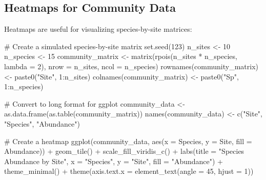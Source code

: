 \documentclass[
  letterpaper,
]{book}
\newenvironment{Shaded}{\begin{snugshade}}{\end{snugshade}}
\newcommand{\AttributeTok}[1]{\textcolor[rgb]{0.40,0.45,0.13}{#1}}
\newcommand{\CommentTok}[1]{\textcolor[rgb]{0.37,0.37,0.37}{#1}}
\newcommand{\DecValTok}[1]{\textcolor[rgb]{0.68,0.00,0.00}{#1}}
\newcommand{\FunctionTok}[1]{\textcolor[rgb]{0.28,0.35,0.67}{#1}}
\newcommand{\NormalTok}[1]{\textcolor[rgb]{0.00,0.23,0.31}{#1}}
\newcommand{\OtherTok}[1]{\textcolor[rgb]{0.00,0.23,0.31}{#1}}
\newcommand{\SpecialCharTok}[1]{\textcolor[rgb]{0.37,0.37,0.37}{#1}}
\newcommand{\StringTok}[1]{\textcolor[rgb]{0.13,0.47,0.30}{#1}}
\begin{document}
\subsection{Heatmaps for Community
Data}\label{heatmaps-for-community-data}

Heatmaps are useful for visualizing species-by-site matrices:

\begin{Shaded}
\begin{Highlighting}[]
\CommentTok{\# Create a simulated species{-}by{-}site matrix}
\FunctionTok{set.seed}\NormalTok{(}\DecValTok{123}\NormalTok{)}
\NormalTok{n\_sites }\OtherTok{\textless{}{-}} \DecValTok{10}
\NormalTok{n\_species }\OtherTok{\textless{}{-}} \DecValTok{15}
\NormalTok{community\_matrix }\OtherTok{\textless{}{-}} \FunctionTok{matrix}\NormalTok{(}\FunctionTok{rpois}\NormalTok{(n\_sites }\SpecialCharTok{*}\NormalTok{ n\_species, }\AttributeTok{lambda =} \DecValTok{2}\NormalTok{), }
                          \AttributeTok{nrow =}\NormalTok{ n\_sites, }\AttributeTok{ncol =}\NormalTok{ n\_species)}
\FunctionTok{rownames}\NormalTok{(community\_matrix) }\OtherTok{\textless{}{-}} \FunctionTok{paste0}\NormalTok{(}\StringTok{"Site"}\NormalTok{, }\DecValTok{1}\SpecialCharTok{:}\NormalTok{n\_sites)}
\FunctionTok{colnames}\NormalTok{(community\_matrix) }\OtherTok{\textless{}{-}} \FunctionTok{paste0}\NormalTok{(}\StringTok{"Sp"}\NormalTok{, }\DecValTok{1}\SpecialCharTok{:}\NormalTok{n\_species)}

\CommentTok{\# Convert to long format for ggplot}
\NormalTok{community\_data }\OtherTok{\textless{}{-}} \FunctionTok{as.data.frame}\NormalTok{(}\FunctionTok{as.table}\NormalTok{(community\_matrix))}
\FunctionTok{names}\NormalTok{(community\_data) }\OtherTok{\textless{}{-}} \FunctionTok{c}\NormalTok{(}\StringTok{"Site"}\NormalTok{, }\StringTok{"Species"}\NormalTok{, }\StringTok{"Abundance"}\NormalTok{)}

\CommentTok{\# Create a heatmap}
\FunctionTok{ggplot}\NormalTok{(community\_data, }\FunctionTok{aes}\NormalTok{(}\AttributeTok{x =}\NormalTok{ Species, }\AttributeTok{y =}\NormalTok{ Site, }\AttributeTok{fill =}\NormalTok{ Abundance)) }\SpecialCharTok{+}
  \FunctionTok{geom\_tile}\NormalTok{() }\SpecialCharTok{+}
  \FunctionTok{scale\_fill\_viridis\_c}\NormalTok{() }\SpecialCharTok{+}
  \FunctionTok{labs}\NormalTok{(}\AttributeTok{title =} \StringTok{"Species Abundance by Site"}\NormalTok{,}
       \AttributeTok{x =} \StringTok{"Species"}\NormalTok{,}
       \AttributeTok{y =} \StringTok{"Site"}\NormalTok{,}
       \AttributeTok{fill =} \StringTok{"Abundance"}\NormalTok{) }\SpecialCharTok{+}
  \FunctionTok{theme\_minimal}\NormalTok{() }\SpecialCharTok{+}
  \FunctionTok{theme}\NormalTok{(}\AttributeTok{axis.text.x =} \FunctionTok{element\_text}\NormalTok{(}\AttributeTok{angle =} \DecValTok{45}\NormalTok{, }\AttributeTok{hjust =} \DecValTok{1}\NormalTok{))}
\end{Highlighting}
\end{Shaded}
\end{document}
